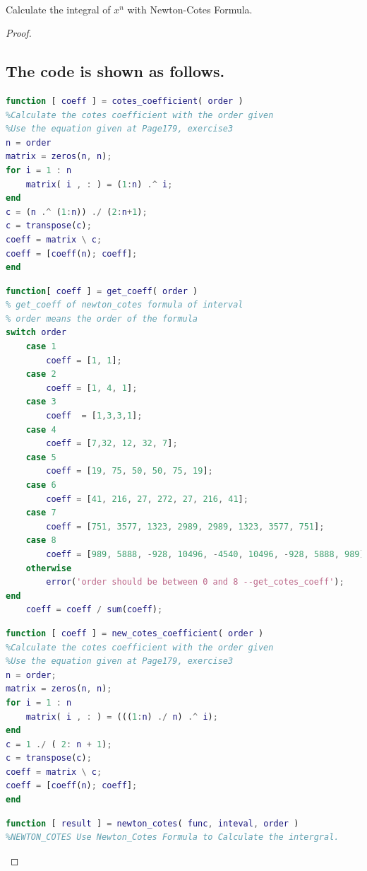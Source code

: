 \documentclass[48pt]{article}
\newenvironment{problem}[2][Problem]{\begin{trivlist}
\item[\hskip \labelsep {\bfseries #1}\hskip \labelsep {\bfseries #2.}]}{\end{trivlist}}
\begin{document}
\begin{problem}{2}
\text{ }\\
Calculate the integral of $x^{n}$ with Newton-Cotes Formula.
\end{problem}
\begin{proof}
\subsection{The code is shown as follows.}

\begin{lstlisting}[language = {MATLAB}]
function [ coeff ] = cotes_coefficient( order )
%Calculate the cotes coefficient with the order given
%Use the equation given at Page179, exercise3
n = order
matrix = zeros(n, n);
for i = 1 : n
    matrix( i , : ) = (1:n) .^ i;
end
c = (n .^ (1:n)) ./ (2:n+1);
c = transpose(c);
coeff = matrix \ c;
coeff = [coeff(n); coeff];
end
\end{lstlisting}

\begin{lstlisting}[language = {MATLAB}]
function[ coeff ] = get_coeff( order )
% get_coeff of newton_cotes formula of interval
% order means the order of the formula
switch order
    case 1
        coeff = [1, 1];
    case 2
        coeff = [1, 4, 1];
    case 3
        coeff  = [1,3,3,1];
    case 4
        coeff = [7,32, 12, 32, 7];
    case 5
        coeff = [19, 75, 50, 50, 75, 19];
    case 6
        coeff = [41, 216, 27, 272, 27, 216, 41];
    case 7
        coeff = [751, 3577, 1323, 2989, 2989, 1323, 3577, 751];
    case 8
        coeff = [989, 5888, -928, 10496, -4540, 10496, -928, 5888, 989];
    otherwise
        error('order should be between 0 and 8 --get_cotes_coeff');
end
    coeff = coeff / sum(coeff);
\end{lstlisting}

\begin{lstlisting}[language = {MATLAB}]
function [ coeff ] = new_cotes_coefficient( order )
%Calculate the cotes coefficient with the order given
%Use the equation given at Page179, exercise3
n = order;
matrix = zeros(n, n);
for i = 1 : n
    matrix( i , : ) = (((1:n) ./ n) .^ i);
end
c = 1 ./ ( 2: n + 1);
c = transpose(c);
coeff = matrix \ c;
coeff = [coeff(n); coeff];
end
\end{lstlisting}

\begin{lstlisting}[language = {MATLAB}]
function [ result ] = newton_cotes( func, inteval, order )
%NEWTON_COTES Use Newton_Cotes Formula to Calculate the intergral.


\end{lstlisting}
\end{proof}
\end{document}
